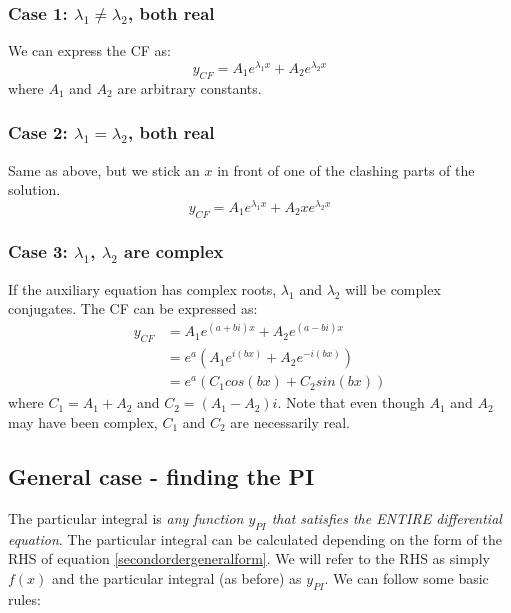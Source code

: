 \documentclass{scrartcl}
\begin{document}
\subsubsection*{Case 1: $ \lambda_{1} \neq \lambda_{2} $, both real}
We can express the CF as:
\begin{equation}
y_{CF} = A_{1}e^{\lambda_{1}x} + A_{2}e^{\lambda_{2}x}
\end{equation}
where $ A_{1} $ and $ A_{2} $ are arbitrary constants.

\subsubsection*{Case 2: $ \lambda_{1} = \lambda_{2} $, both real}
Same as above, but we stick an $ x $ in front of one of the clashing parts of the solution.
\begin{equation}
y_{CF} = A_{1}e^{\lambda_{1}x} + A_{2}xe^{\lambda_{2}x}
\end{equation}

\subsubsection*{Case 3: $ \lambda_{1} $, $ \lambda_{2} $ are complex}
If the auxiliary equation has complex roots, $ \lambda_{1} $ and $ \lambda_{2} $ will be complex conjugates. The CF can be expressed as:
\begin{equation}
\begin{split}
y_{CF} & = A_{1}e^{(a + bi)x} + A_{2}e^{(a - bi)x} \\
       & = e^{a}(A_{1}e^{i(bx)} + A_{2}e^{- i(bx)}) \\
       & = e^{a}(C_{1}cos(bx) + C_{2}sin(bx))
\end{split}
\end{equation}
where $ C_{1} = A_{1} + A_{2} $ and $ C_{2} = (A_{1} - A_{2})i $. Note that even though $ A_{1} $ and $ A_{2} $ may have been complex, $ C_{1} $ and $ C_{2} $ are necessarily real.

\subsection{General case - finding the PI}
The particular integral is \emph{any function $ y_{PI} $ that satisfies the ENTIRE differential equation}. The particular integral can be calculated depending on the form of the RHS of equation \ref{secondordergeneralform}. We will refer to the RHS as simply $ f(x) $ and the particular integral (as before) as $ y_{PI} $. We can follow some basic rules:
\end{document}
